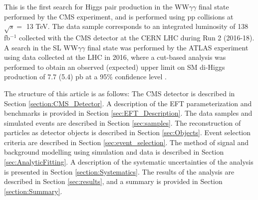 This is the first search for Higgs pair production in the WW$\gamma\gamma$ final state performed by the CMS experiment, and is performed using pp collisions at $\sqrt{s} = $ 13 TeV.
The data sample corresponds to an integrated luminosity of 138 \unit{fb}$^{-1}$ collected with the CMS detector at the CERN LHC during Run 2 (2016-18).
A search in the SL WW$\gamma\gamma$ final state was performed 
by the ATLAS experiment using data collected at the LHC in 2016, where a cut-based analysis was performed to obtain an observed (expected) upper limit on SM di-Higgs
production of 7.7 (5.4) pb at a 95\% confidence level \cite{Aaboud2018}. 

The structure of this article is as follows: The CMS detector is described in Section \ref{section:CMS_Detector}. A description of the EFT parameterization and
benchmarks is provided in Section \ref{sec:EFT_Description}. The data samples and simulated events are described in Section \ref{sec:samples}. 
The reconstruction of particles as detector objects is described in Section \ref{sec:Objects}. Event selection criteria are described in Section \ref{sec:event_selection}. 
The method of signal and background modelling using simulation and data is
described in Section \ref{sec:AnalyticFitting}. A description of the systematic uncertainties of the analysis is presented in Section \ref{section:Systematics}.
The results of the analysis are described in Section \ref{sec:results}, and a summary is provided in Section \ref{section:Summary}. 
